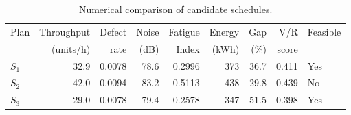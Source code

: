\begin{table}[htbp]
\centering
\caption{Numerical comparison of candidate schedules.}
\label{tab:numerical-sim}
\small
\begin{tabular}{@{}lrrrrrrrl@{}}
\toprule
Plan & Throughput & Defect & Noise & Fatigue & Energy & Gap & V/R & Feasible \\
     & (units/h)  & rate   & (dB)  & Index   & (kWh)  & (\%) & score &         \\
\midrule
$S_{1}$ & 32.9 & 0.0078 & 78.6 & 0.2996 & 373 & 36.7 & 0.411 & Yes \\
$S_{2}$ & 42.0 & 0.0094 & 83.2 & 0.5113 & 438 & 29.8 & 0.439 & No \\
$S_{3}$ & 29.0 & 0.0078 & 79.4 & 0.2578 & 347 & 51.5 & 0.398 & Yes \\
\bottomrule
\end{tabular}
\end{table}
